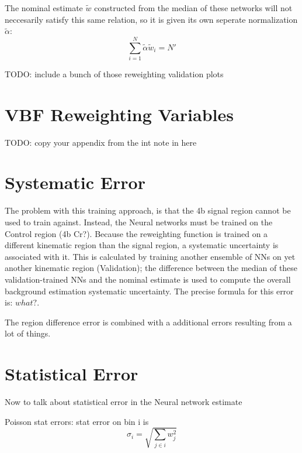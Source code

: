 The nominal estimate $\tilde{w}$ constructed from the median of these networks will not neccesarily satisfy this same relation,
    so it is given its own seperate normalization $\tilde \alpha$:
    \begin{equation}
    \sum_{i=1}^{N} \tilde \alpha \tilde w_i = N'
    \end{equation}

    TODO: include a bunch of those reweighting validation plots


\section{VBF Reweighting Variables}
    
    TODO: copy your appendix from the int note in here

\section{Systematic Error}

The problem with this training approach, is that the 4b signal region cannot be used to train against.
Instead, the Neural networks must be trained on the Control region (4b Cr?).
Because the reweighting function is trained on a different kinematic region than the signal region,
    a systematic uncertainty is associated with it.
This is calculated by training another ensemble of NNs on yet another kinematic region (Validation);
    the difference between the median of these validation-trained NNs and the nominal estimate
    is used to compute the overall background estimation systematic uncertainty.
The precise formula for this error is:
    $what?$.


The region difference error is combined with a additional errors resulting from a lot of things.

\section{Statistical Error}

Now to talk about statistical error in the Neural network estimate

Poisson stat errors: stat error on bin i is 
    \begin{equation}
    \sigma_i = \sqrt{\sum_{j \in i} w_j^2}
    \end{equation}

